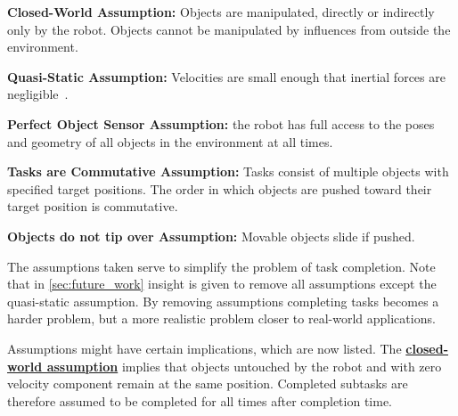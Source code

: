 \begin{assumption*}%
\label{assumption:closed_world}
\textbf{Closed-World Assumption:} Objects are manipulated, directly or indirectly only by the robot. Objects cannot be manipulated by influences from outside the environment.
\end{assumption*}\bs

\begin{assumption*}%
\label{assumption:quasi_static}
\textbf{Quasi-Static Assumption:} Velocities are small enough that inertial forces are negligible~\cite{stuber_let_2020}.
\end{assumption*}\bs
{}

\begin{assumption*}%
\label{assumption:perfect_object_sensor}
\textbf{Perfect Object Sensor Assumption:} the robot has full access to the poses and geometry of all objects in the environment at all times.
\end{assumption*}\bs

\begin{assumption*}%
\label{assumption:order_does_not_matter}
\textbf{Tasks are Commutative Assumption:} Tasks consist of multiple objects with specified target positions. The order in which objects are pushed toward their target position is commutative.
\end{assumption*}\bs

\begin{assumption*}%
\label{assumption:no_tipping}
\textbf{Objects do not tip over Assumption:} Movable objects slide if pushed.
\end{assumption*}\bs

The assumptions taken serve to simplify the problem of task completion. Note that in \cref{sec:future_work} insight is given to remove all assumptions except the quasi-static assumption. By removing assumptions completing tasks becomes a harder problem, but a more realistic problem closer to real-world applications.\bs

Assumptions might have certain implications, which are now listed. The \hyperref[assumption:closed_world]{\textbf{closed-world assumption}} implies that objects untouched by the robot and with zero velocity component remain at the same position. Completed subtasks are therefore assumed to be completed for all times after completion time.\bs


